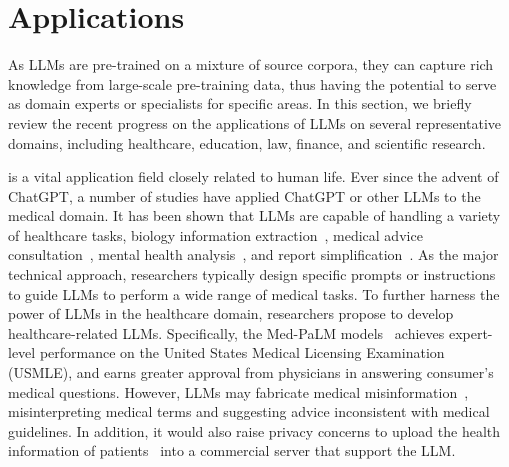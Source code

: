 \section{Applications}\label{sec-application}


As LLMs are pre-trained on a mixture of source corpora, they can capture rich knowledge from large-scale pre-training data, thus having the potential to serve as domain experts or specialists for specific areas. 
In this section, we briefly review the recent progress on the applications of LLMs on several representative domains, including healthcare, education, law, finance, and scientific research. 

 is a vital application field closely related to human life. Ever since the advent of ChatGPT, a number of studies have applied ChatGPT or other LLMs to the medical domain. 
It has been shown that LLMs are capable of handling  %
{a variety of healthcare tasks, \eg biology information extraction~\cite{tang-arxiv-2023-does}, medical advice consultation~\cite{Nov-arxiv-2023-Medical}, mental health analysis~\cite{Yang-arxiv-2023-mental}, and report simplification~\cite{Jeblick-arxiv-2023-Medicine}}. 
{As the major technical approach, researchers typically design specific prompts or instructions to guide LLMs to perform a wide range of medical tasks. }
To further harness the power of LLMs in the healthcare domain, researchers propose to develop healthcare-related  LLMs.
Specifically, the Med-PaLM models~\cite{singhal-arxiv-2022-large,Singhal-2023-arxiv-Towards} achieves  expert-level performance  on the {United States Medical Licensing Examination (USMLE)}, and earns greater approval from physicians in answering consumer's medical questions.
However, LLMs may fabricate medical misinformation~\cite{Jeblick-arxiv-2023-Medicine,Chen-medrxiv-2023-cancer}, \eg misinterpreting  medical terms and suggesting advice inconsistent  with medical guidelines.  In addition, it would also raise privacy concerns to upload the health information of patients~\cite{tang-arxiv-2023-does} into a commercial server that support the LLM.

